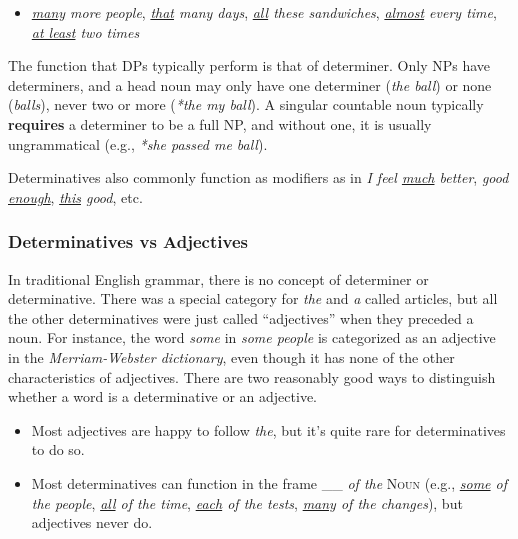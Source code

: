 \begin{itemize}[noitemsep]
    \item \textit{\ob\uline{many} more{\cb} people},  \textit{\ob\uline{that} many{\cb} days},  \textit{\ob\uline{all} these{\cb} sandwiches}, \textit{\ob\uline{almost} every{\cb} time}, \textit{\ob\uline{at least} two{\cb} times}
\end{itemize}

The function that DPs typically perform is that of determiner. Only NPs have determiners, and a head noun may only have one determiner (\textit{the ball}) or none (\textit{balls}), never two or more (\textit{*the my ball}). A singular countable noun typically \textbf{requires} a determiner to be a full NP, and without one, it is usually ungrammatical (e.g., \textit{*she passed me ball}).

Determinatives also commonly function as modifiers as in \textit{I feel \ob\uline{much} better{\cb}}, \ob\textit{good \uline{enough}{\cb}}, \textit{\ob\uline{this} good{\cb}}, etc.

\subsubsection*{Determinatives vs Adjectives}

In traditional English grammar, there is no concept of determiner or determinative. There was a special category for \textit{the} and \textit{a} called articles, but all the other determinatives were just called ``adjectives'' when they preceded a noun. For instance, the word \textit{some} in \textit{some people} is categorized as an adjective in the \textit{Merriam-Webster dictionary}, even though it has none of the other characteristics of adjectives. There are two reasonably good ways to distinguish whether a word is a determinative or an adjective.

\begin{itemize}[noitemsep]
    \item {}Most adjectives are happy to follow \textit{the}, but it's quite rare for determinatives to do so.
    \item {}Most determinatives can function in the frame \_\_ \textit{of the} \textsc{Noun} (e.g., \textit{\uline{some} of the people}, \textit{\uline{all} of the time}, \textit{\uline{each} of the tests}, \textit{\uline{many} of the changes}), but adjectives never do.
\end{itemize}

